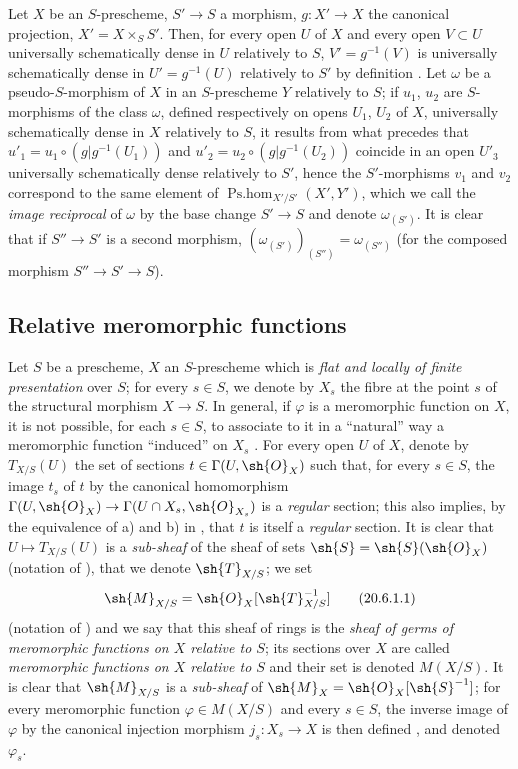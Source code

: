 \begin{env}[20.5.8]
\label{IV.20.5.8}
Let $X$ be an $S$-prescheme, $S'\to S$ a morphism, $g:X'\to X$ the canonical projection, $X'=X\times_S S'$.
Then, for every open $U$ of $X$ and every open $V\subset U$ universally schematically dense in $U$ relatively to $S$, $V'=g^{-1}(V)$ is universally schematically dense in $U'=g^{-1}(U)$ relatively to $S'$ by definition .
Let $\omega$ be a pseudo-$S$-morphism of $X$ in an $S$-prescheme $Y$ relatively to $S$;
if $u_1$, $u_2$ are $S$-morphisms of the class $\omega$, defined respectively on opens $U_1$, $U_2$ of $X$, universally schematically dense in $X$ relatively to $S$, it results from what precedes that $u'_1=u_1\circ(g|g^{-1}(U_1))$ and $u'_2=u_2\circ(g|g^{-1}(U_2))$ coincide in an open $U'_3$ universally schematically dense relatively to $S'$, hence the $S'$-morphisms $v_1$ and $v_2$ correspond to the same element of $\operatorname{Ps.hom}_{X'/S'}(X',Y')$, which we call the \emph{image reciprocal} of $\omega$ by the base change $S'\to S$ and denote $\omega_{(S')}$.
It is clear that if $S''\to S'$ is a second morphism, $(\omega_{(S')})_{(S'')}=\omega_{(S'')}$ (for the composed morphism $S''\to S'\to S$).
\end{env}

\subsection{Relative meromorphic functions}
\label{IV.20.6}

\begin{env}[20.6.1]
\label{IV.20.6.1}
Let $S$ be a prescheme, $X$ an $S$-prescheme which is \emph{flat and locally of finite presentation} over $S$;
for every $s\in S$, we denote by $X_s$ the fibre at the point $s$ of the structural morphism $X\to S$.
In general, if $\varphi$ is a meromorphic function on $X$, it is not possible, for each $s\in S$, to associate to it in a ``natural'' way a meromorphic function ``induced'' on $X_s$ .
For every open $U$ of $X$, denote by $T_{X/S}(U)$ the set of sections $t\in\Gamma(U,\sh{O}_X)$ such that, for every $s\in S$, the image $t_s$ of $t$ by the canonical homomorphism $\Gamma(U,\sh{O}_X)\to\Gamma(U\cap X_s,\sh{O}_{X_s})$ is a \emph{regular} section;
this also implies, by the equivalence of a) and b) in , that $t$ is itself a \emph{regular} section.
It is clear that $U\mapsto T_{X/S}(U)$ is a \emph{sub-sheaf} of the sheaf of sets $\sh{S}=\sh{S}(\sh{O}_X)$ (notation of ), that we denote $\sh{T}_{X/S}$;
we set
\[
\label{IV.20.6.1.1}
  \sh{M}_{X/S}=\sh{O}_X[\sh{T}_{X/S}^{-1}]
  \tag{20.6.1.1}
\]
(notation of ) and we say that this sheaf of rings is the \emph{sheaf of germs of meromorphic functions on $X$ relative to $S$};
its sections over $X$ are called \emph{meromorphic functions on $X$ relative to $S$} and their set is denoted $M(X/S)$.
It is clear that $\sh{M}_{X/S}$ is a \emph{sub-sheaf} of $\sh{M}_X=\sh{O}_X[\sh{S}^{-1}]$;
for every meromorphic function $\varphi\in M(X/S)$ and every $s\in S$, the inverse image of $\varphi$ by the canonical injection morphism $j_s:X_s\to X$ is then defined , and denoted $\varphi_s$.
\end{env}

